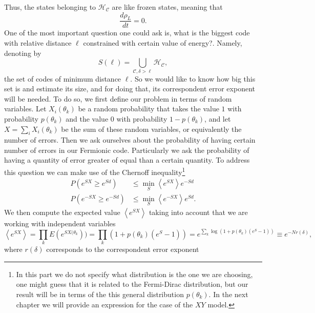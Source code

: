 \indent Thus, the states belonging to $ \mathcal{H}_{\mathcal{C}}$ are like frozen states, meaning that
\begin{equation}
\frac{d\rho_L}{dt}=0.
\end{equation}
\indent One of the most important question one could ask is, what is the biggest code with relative distance $\ell$ constrained with certain value of energy?. Namely, denoting by
\begin{equation}
S(\ell) = \bigcup_{\mathcal{C}, \delta>\ell}\mathcal{H}_{\mathcal{C}},
\end{equation} 
the set of codes of minimum distance $\ell$. So we would like to know how big this set is and estimate its size, and for doing that, its correspondent error exponent will be needed. To do so, we first define our problem in terms of random variables. Let $X_i(\theta_k)$ be a random probability that takes the value $1$ with probability $p(\theta_k)$ and the value $0$ with probability $1-p(\theta_k)$, and let $X=\sum_{i}X_i(\theta_k)$ be the sum of these random variables, or equivalently the number of errors. Then we ask ourselves about the probability of having certain number of errors in our Fermionic code. Particularly we ask the probability of having a quantity of error greater of equal than a certain quantity. To address this question we can make use of the Chernoff inequality\footnote{In this part we do not specify what distribution is the one we are choosing, one might guess that it is related to the Fermi-Dirac distribution, but our result will be in terms of the this general distribution $p(\theta_k)$. In the next chapter we will provide an expression for the case of the $XY$ model.} 
\begin{equation}
\begin{aligned}
P(e^{S X}\geq e^{S d})&\leq \min_{S}\left\langle e^{S X}\right\rangle e^{-S d}\\
P(e^{-S X}\geq e^{-S d})&\leq \min_{S}\left\langle e^{-S X}\right\rangle e^{S d}.
\end{aligned}
\end{equation}
\indent We then compute the expected value $\left\langle e^{S X}\right\rangle$ taking into account that we are working with independent variables
\begin{equation}
\left\langle e^{S X}\right\rangle = \prod_{k}  E(e^{S X(\theta_k})) = \prod_k \left(1+p(\theta_k)(e^S -1)\right) = e^{\sum_{k}\log(1+p(\theta_k)(e^S -1))}\equiv e^{-Nr(\delta)},
\end{equation}
where $r(\delta)$ corresponds to the correspondent error exponent
